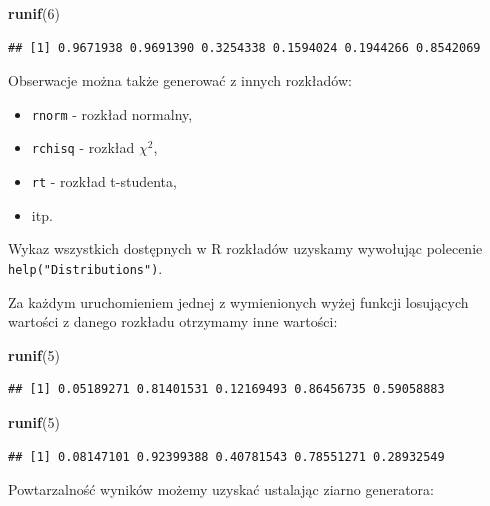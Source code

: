 \documentclass[]{book}
\newenvironment{Shaded}{\begin{snugshade}}{\end{snugshade}}
\newcommand{\KeywordTok}[1]{\textcolor[rgb]{0.13,0.29,0.53}{\textbf{#1}}}
\newcommand{\DecValTok}[1]{\textcolor[rgb]{0.00,0.00,0.81}{#1}}
\newcommand{\NormalTok}[1]{#1}
\providecommand{\tightlist}{%
  \setlength{\itemsep}{0pt}\setlength{\parskip}{0pt}}
\begin{document}
\begin{Shaded}
\begin{Highlighting}[]
\KeywordTok{runif}\NormalTok{(}\DecValTok{6}\NormalTok{)}
\end{Highlighting}
\end{Shaded}

\begin{verbatim}
## [1] 0.9671938 0.9691390 0.3254338 0.1594024 0.1944266 0.8542069
\end{verbatim}

Obserwacje można także generować z innych rozkładów:

\begin{itemize}
\tightlist
\item
  \texttt{rnorm} - rozkład normalny,
\item
  \texttt{rchisq} - rozkład \(\chi^2\),
\item
  \texttt{rt} - rozkład t-studenta,
\item
  itp.
\end{itemize}

Wykaz wszystkich dostępnych w R rozkładów uzyskamy wywołując polecenie
\texttt{help("Distributions")}.

Za każdym uruchomieniem jednej z wymienionych wyżej funkcji losujących
wartości z danego rozkładu otrzymamy inne wartości:

\begin{Shaded}
\begin{Highlighting}[]
\KeywordTok{runif}\NormalTok{(}\DecValTok{5}\NormalTok{)}
\end{Highlighting}
\end{Shaded}

\begin{verbatim}
## [1] 0.05189271 0.81401531 0.12169493 0.86456735 0.59058883
\end{verbatim}

\begin{Shaded}
\begin{Highlighting}[]
\KeywordTok{runif}\NormalTok{(}\DecValTok{5}\NormalTok{)}
\end{Highlighting}
\end{Shaded}

\begin{verbatim}
## [1] 0.08147101 0.92399388 0.40781543 0.78551271 0.28932549
\end{verbatim}

Powtarzalność wyników możemy uzyskać ustalając ziarno generatora:
\end{document}
